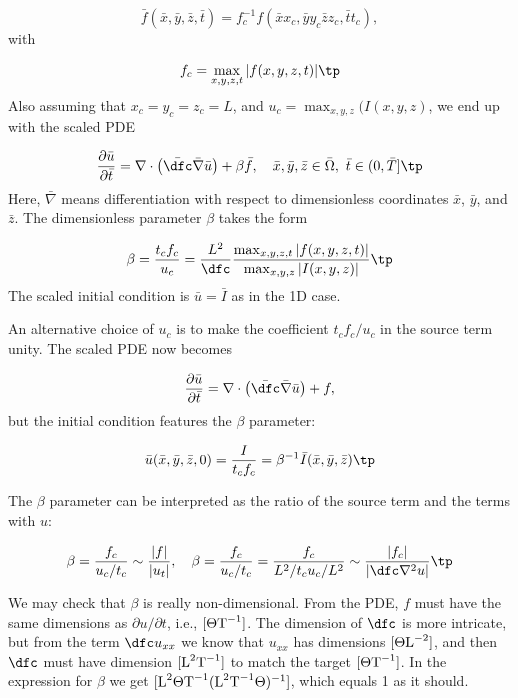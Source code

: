 \documentclass[graybox,envcountchap,sectrefs,final]{svmonodo}
\begin{document}
\[ \bar f(\bar x, \bar y, \bar z, \bar t)
= f_c^{-1}f(\bar xx_c, \bar yy_c \bar zz_c, \bar tt_c),\]
with

\[ f_c = \max_{x,y,z,t}|f(x,y,z,t)|\tp\]
Also assuming
that $x_c=y_c=z_c=L$, and $u_c=\max_{x,y,z}(I(x,y,z)$,
we end up with the scaled PDE

\begin{equation}
\frac{\partial \bar u}{\partial \bar t} =
\nabla\cdot\left(\bar\dfc \bar\nabla \bar u\right) + \beta\bar f, \quad  \bar x,\bar y,\bar z\in \bar \Omega,\ \bar t\in (0,\bar T]\tp
\label{sec:scale:diffu:pde1:3D:d}
\end{equation}
Here, $\bar\nabla$ means differentiation with respect to dimensionless
coordinates $\bar x$, $\bar y$, and $\bar z$. The dimensionless parameter
$\beta$ takes the form

\[ \beta = \frac{t_cf_c}{u_c} = \frac{L^2}{\dfc}
\frac{\max_{x,y,z,t}|f(x,y,z,t)|}{\max_{x,y,z}|I(x,y,z)|}\tp\]
The scaled initial condition is $\bar u = \bar I$ as in the 1D case.

An alternative choice of $u_c$ is to make the coefficient $t_cf_c/u_c$
in the source term unity. The scaled PDE now becomes

\begin{equation}
\frac{\partial \bar u}{\partial \bar t} =
\nabla\cdot\left(\bar\dfc \bar\nabla \bar u\right) + f,
\label{sec:scale:diffu:pde1:3D:d2}
\end{equation}
but the initial condition features the $\beta$ parameter:

\[ \bar u(\bar x, \bar y, \bar z, 0) = \frac{I}{t_cf_c} =
\beta^{-1}\bar I(\bar x,\bar y,\bar z)\tp
\]

The $\beta$ parameter can be interpreted as the ratio of the source
term and the terms with $u$:

\[ \beta = \frac{f_c}{u_c/t_c}\sim \frac{|f|}{|u_t|},\quad
\beta = \frac{f_c}{u_c/t_c} = \frac{f_c}{L^2/t_c u_c/L^2}\sim
\frac{|f_c|}{|\dfc\nabla^2 u|}\tp
\]

We may check that $\beta$ is really non-dimensional. From the PDE,
$f$ must have the same dimensions as $\partial u/\partial t$, i.e.,
$[\Theta\hbox{T}^{-1}]$.
The dimension of $\dfc$ is more intricate, but from the term
$\dfc u_{xx}$ we know that $u_{xx}$ has dimensions $[\Theta\hbox{L}^{-2}]$,
and then $\dfc$ must have dimension $[\hbox{L}^2\hbox{T}^{-1}]$
to match the target $[\Theta\hbox{T}^{-1}]$.
In the expression for $\beta$ we get
$[\hbox{L}^2\Theta\hbox{T}^{-1}(\hbox{L}^2\hbox{T}^{-1}\Theta)^{-1}]$,
which equals 1 as it should.
\end{document}
